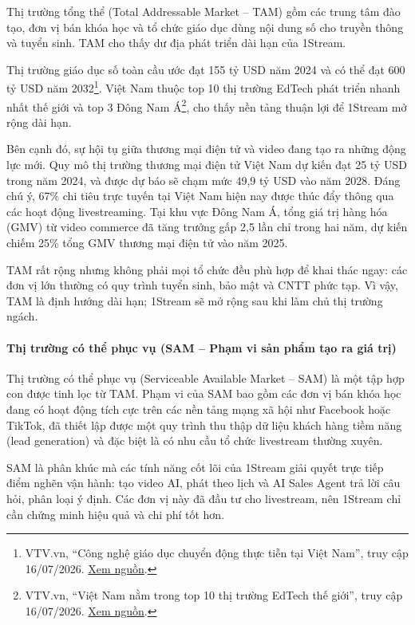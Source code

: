 Thị trường tổng thể (Total Addressable Market -- TAM) gồm các trung tâm đào tạo, đơn vị bán khóa học và tổ chức giáo dục dùng nội dung số cho truyền thông và tuyển sinh. TAM cho thấy dư địa phát triển dài hạn của 1Stream.

Thị trường giáo dục số toàn cầu ước đạt 155 tỷ USD năm 2024 và có thể đạt 600 tỷ USD năm 2032\footnote{VTV.vn, ``Công nghệ giáo dục chuyển động thực tiễn tại Việt Nam'', truy cập 16/07/2026. \href{https://vtv.vn/cong-nghe-giao-duc-chuyen-dong-thuc-tien-tai-viet-nam-100251126151950065.htm}{Xem nguồn}.}. Việt Nam thuộc top 10 thị trường EdTech phát triển nhanh nhất thế giới và top 3 Đông Nam Á\footnote{VTV.vn, ``Việt Nam nằm trong top 10 thị trường EdTech thế giới'', truy cập 16/07/2026. \href{https://vtv.vn/viet-nam-nam-trong-top-10-thi-truong-edtech-the-gioi-100250818170306599.htm}{Xem nguồn}.}, cho thấy nền tảng thuận lợi để 1Stream mở rộng dài hạn.

Bên cạnh đó, sự hội tụ giữa thương mại điện tử và video đang tạo ra những động lực mới. Quy mô thị trường thương mại điện tử Việt Nam dự kiến đạt 25 tỷ USD trong năm 2024, và được dự báo sẽ chạm mức 49,9 tỷ USD vào năm 2028. Đáng chú ý, 67\% chi tiêu trực tuyến tại Việt Nam hiện nay được thúc đẩy thông qua các hoạt động livestreaming. Tại khu vực Đông Nam Á, tổng giá trị hàng hóa (GMV) từ video commerce đã tăng trưởng gấp 2,5 lần chỉ trong hai năm, dự kiến chiếm 25\% tổng GMV thương mại điện tử vào năm 2025.

TAM rất rộng nhưng không phải mọi tổ chức đều phù hợp để khai thác ngay: các đơn vị lớn thường có quy trình tuyển sinh, bảo mật và CNTT phức tạp. Vì vậy, TAM là định hướng dài hạn; 1Stream sẽ mở rộng sau khi làm chủ thị trường ngách.

\paragraph{Thị trường có thể phục vụ (SAM -- Phạm vi sản phẩm tạo ra giá trị)}

Thị trường có thể phục vụ (Serviceable Available Market -- SAM) là một tập hợp con được tinh lọc từ TAM. Phạm vi của SAM bao gồm các đơn vị bán khóa học đang có hoạt động tích cực trên các nền tảng mạng xã hội như Facebook hoặc TikTok, đã thiết lập được một quy trình thu thập dữ liệu khách hàng tiềm năng (lead generation) và đặc biệt là có nhu cầu tổ chức livestream thường xuyên.

SAM là phân khúc mà các tính năng cốt lõi của 1Stream giải quyết trực tiếp điểm nghẽn vận hành: tạo video AI, phát theo lịch và AI Sales Agent trả lời câu hỏi, phân loại ý định. Các đơn vị này đã đầu tư cho livestream, nên 1Stream chỉ cần chứng minh hiệu quả và chi phí tốt hơn.


